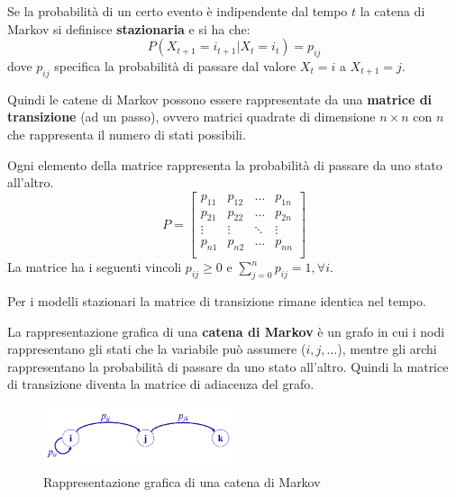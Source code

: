 Se la probabilità di un certo evento è indipendente dal tempo $t$ la catena di
Markov si definisce \textbf{stazionaria} e si ha che:
\begin{equation}
    P(X_{t+1} = i_{t+1 } | X_t =i_t) = p_{ij}
\end{equation}
dove $p_{ij}$ specifica la probabilità di passare dal valore $X_t = i$ a $X_{t + 1} = j$.

Quindi le catene di Markov possono essere rappresentate da una \textbf{matrice di
    transizione} (ad un passo), ovvero matrici quadrate di dimensione $n \times n$
con $n$ che rappresenta il numero di stati possibili.

Ogni elemento della matrice rappresenta la probabilità di passare da uno stato
all'altro.
\begin{equation*}
    P = \begin{bmatrix}
        p_{11} & p_{12} & \dots  & p_{1n} \\
        p_{21} & p_{22} & \dots  & p_{2n} \\
        \vdots & \vdots & \ddots & \vdots \\
        p_{n1} & p_{n2} & \dots  & p_{nn} \\
    \end{bmatrix}
\end{equation*}
La matrice ha i seguenti vincoli $p_{ij} \geq 0$ e $\sum_{j=0}^{n}p_{ij}=1, \forall i$.
\begin{nota}
    Per i modelli stazionari la matrice di transizione rimane identica nel tempo.
\end{nota}

La rappresentazione grafica di una \textbf{catena di Markov} è un grafo in cui i
nodi rappresentano gli stati che la variabile può assumere ($i,j,\dots$), mentre
gli archi rappresentano la probabilità di passare da uno stato all'altro. Quindi
la matrice di transizione diventa la matrice di adiacenza del grafo.
\begin{figure}[!ht]
    \centering
    \includegraphics[width=0.5\textwidth]{img/catene/markovChain.png}
    \caption{Rappresentazione grafica di una catena di Markov}
    \label{fig:markovChain}
\end{figure}

